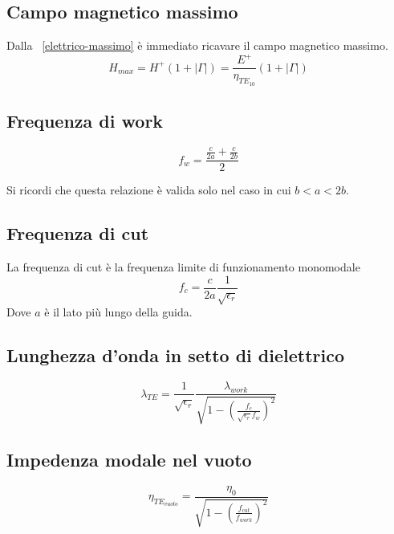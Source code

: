 		\subsection{Campo magnetico massimo}
		Dalla ~\ref{elettrico-massimo} è immediato ricavare il campo magnetico massimo.
				\begin{equation}
				H_{max}=H^+(1+|\Gamma|)=\frac{E^+}{\eta_{TE_{10}}}{(1+|\Gamma|)}
				\end{equation}

		\subsection{Frequenza di work}

				\begin{equation}
				f_w=\frac{\frac{c}{2a}+\frac{c}{2b}}{2}
				\end{equation}

				Si ricordi che questa relazione è valida solo nel caso in cui $b<a<2b$.

		\subsection{Frequenza di cut}
	
				La frequenza di cut è la frequenza limite di funzionamento monomodale
				\begin{equation}
				f_c=\frac{c}{2a}\frac{1}{\sqrt{\epsilon_r}}
				\end{equation}
				Dove $a$ è il lato più lungo della guida.

		\subsection{Lunghezza d'onda in setto di dielettrico}

			\begin{equation}
			\lambda_{TE}=\frac{1}{\sqrt{\epsilon_r}}\frac{\lambda_{work}}{\sqrt{1- (\frac{f_c}{\sqrt{\epsilon_r}f_w})^2}}
			\end{equation}

		\subsection{Impedenza modale nel vuoto}

				\begin{equation}
				\eta_{TE_{vuoto}}=\frac{\eta_0}{ \sqrt{ 1- ( \frac {f_{cut}} {f_{work}} )^2 } }
				\end{equation}
